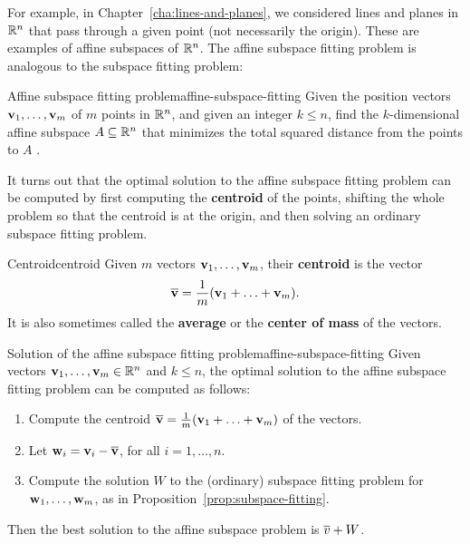 For example, in Chapter~\ref{cha:lines-and-planes}, we considered
lines and planes in $\mathbb{R}^n$ that pass through a given point (not
necessarily the origin). These are examples of affine subspaces of
$\mathbb{R}^n$. The affine subspace fitting problem is analogous to the
subspace fitting problem:

\begin{problem}{Affine subspace fitting problem}{affine-subspace-fitting}
  Given the position vectors $\vect{v}_1,\ldots,\vect{v}_m$ of $m$
  points in $\mathbb{R}^n$, and given an integer $k\leq n$, find the
  $k$-dimensional affine subspace $A\subseteq\mathbb{R}^n$ that minimizes the
  total squared distance from the points to $A$%
  .
\end{problem}

It turns out that the optimal solution to the affine subspace fitting
problem can be computed by first computing the \textbf{centroid} of
the points, shifting the whole problem so that the centroid is at the
origin, and then solving an ordinary subspace fitting problem.

\begin{definition}{Centroid}{centroid}
  Given $m$ vectors $\vect{v}_1,\ldots,\vect{v}_m$, their
  \textbf{centroid}%
   is the vector
  \begin{equation*}
    \centroid{\vect{v}} = \frac{1}{m}(\vect{v}_1+\ldots+\vect{v}_m).
  \end{equation*}
  It is also sometimes called the \textbf{average}%
   or the \textbf{center of mass}%
   of the vectors.
\end{definition}

\begin{proposition}{Solution of the affine subspace fitting problem}{affine-subspace-fitting}
  Given vectors $\vect{v}_1,\ldots,\vect{v}_m\in\R^n$ and $k\leq n$,
  the optimal solution to the affine subspace fitting problem can be
  computed as follows:
  \begin{enumerate}
  \item Compute the centroid $\centroid{\vect{v}} =
    \frac{1}{m}(\vect{v}_1+\ldots+\vect{v}_m)$ of the vectors.
  \item Let $\vect{w}_i = \vect{v}_i - \centroid{\vect{v}}$, for all
    $i=1,\ldots,n$.
  \item Compute the solution $W$ to the (ordinary) subspace fitting
    problem for $\vect{w}_1,\ldots,\vect{w}_m$, as in
    Proposition~\ref{prop:subspace-fitting}.
  \end{enumerate}
  Then the best solution to the affine subspace problem is
  $\overline{v} + W$.
\end{proposition}

